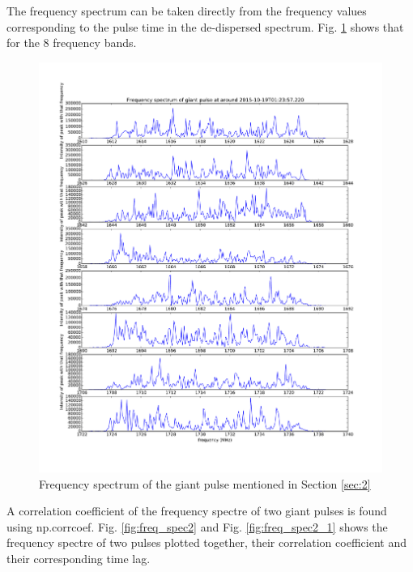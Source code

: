 \documentclass[apj]{emulateapj}
\begin{document}
The frequency spectrum can be taken directly from the frequency values corresponding to the pulse time in the de-dispersed spectrum. Fig. \ref{fig:figureOfSpectrum} shows that for the 8 frequency bands.

\begin{figure}[H]
\includegraphics[width=0.9\columnwidth]{all30_1_freq_spec.pdf}
\caption{Frequency spectrum of the giant pulse mentioned in Section \ref{sec:2}}
\label{fig:figureOfSpectrum}
\end{figure}

A correlation coefficient of the frequency spectre of two giant pulses is found using np.corrcoef. Fig. \ref{fig:freq_spec2} and Fig. \ref{fig:freq_spec2_1} shows the frequency spectre of two pulses plotted together, their correlation coefficient and their corresponding time lag.
\end{document}
